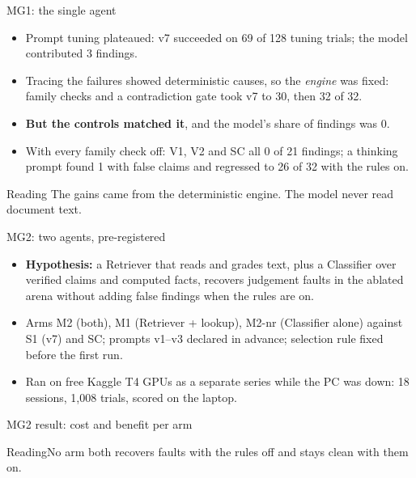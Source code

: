\documentclass[aspectratio=169,11pt,t]{beamer}
\begin{document}
\begin{frame}{MG1: the single agent}
\begin{itemize}
\item Prompt tuning plateaued: v7 succeeded on 69 of 128 tuning trials; the model contributed 3
findings.
\item Tracing the failures showed deterministic causes, so the \emph{engine} was fixed: family
checks and a contradiction gate took v7 to 30, then 32 of 32.
\item \textbf{But the controls matched it}, and the model's share of findings was 0.
\item With every family check off: V1, V2 and SC all 0 of 21 findings; a thinking prompt found 1
with false claims and regressed to 26 of 32 with the rules on.
\end{itemize}
\vspace{0.4em}
\begin{alertblock}{Reading}
The gains came from the deterministic engine. The model never read document text.
\end{alertblock}
\end{frame}

\begin{frame}{MG2: two agents, pre-registered}
\centering
\resizebox{0.95\linewidth}{!}{}
\vspace{0.5em}
\begin{itemize}\small
\item \textbf{Hypothesis:} a Retriever that reads and grades text, plus a Classifier over verified
claims and computed facts, recovers judgement faults in the ablated arena without adding false
findings when the rules are on.
\item Arms M2 (both), M1 (Retriever + lookup), M2-nr (Classifier alone) against S1 (v7) and SC;
prompts v1--v3 declared in advance; selection rule fixed before the first run.
\item Ran on free Kaggle T4 GPUs as a separate series while the PC was down: 18 sessions, 1{,}008
trials, scored on the laptop.
\end{itemize}
\end{frame}

\begin{frame}{MG2 result: cost and benefit per arm}
\centering
\vspace{0.3em}
\resizebox{0.68\linewidth}{!}{}
\vspace{0.4em}

\begin{block}{Reading}\small No arm both recovers faults with the rules off and stays clean with them on.\end{block}
\end{frame}
\end{document}
